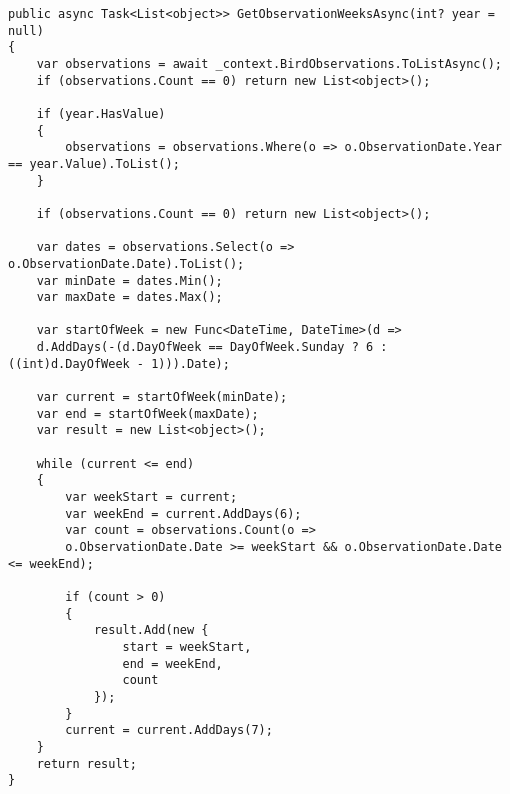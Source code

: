 \begin{lstlisting}[style=csharp, caption={Implementacja serwisu tygodni},label={lst:backendserwistygodni}]
public async Task<List<object>> GetObservationWeeksAsync(int? year = null)
{
	var observations = await _context.BirdObservations.ToListAsync();
	if (observations.Count == 0) return new List<object>();
	
	if (year.HasValue)
	{
		observations = observations.Where(o => o.ObservationDate.Year == year.Value).ToList();
	}
	
	if (observations.Count == 0) return new List<object>();
	
	var dates = observations.Select(o => o.ObservationDate.Date).ToList();
	var minDate = dates.Min();
	var maxDate = dates.Max();
	
	var startOfWeek = new Func<DateTime, DateTime>(d => 
	d.AddDays(-(d.DayOfWeek == DayOfWeek.Sunday ? 6 : ((int)d.DayOfWeek - 1))).Date);
	
	var current = startOfWeek(minDate);
	var end = startOfWeek(maxDate);
	var result = new List<object>();
	
	while (current <= end)
	{
		var weekStart = current;
		var weekEnd = current.AddDays(6);
		var count = observations.Count(o => 
		o.ObservationDate.Date >= weekStart && o.ObservationDate.Date <= weekEnd);
		
		if (count > 0)
		{
			result.Add(new {
				start = weekStart,
				end = weekEnd,
				count
			});
		}
		current = current.AddDays(7);
	}
	return result;
}
\end{lstlisting}